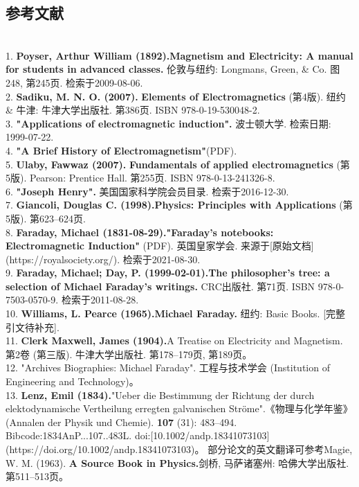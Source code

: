 \subsection{参考文献}\\
1. \textbf{Poyser, Arthur William (1892).}\textbf{Magnetism and Electricity: A manual for students in advanced classes.} 伦敦与纽约: Longmans, Green, & Co. 图248, 第245页. 检索于2009-08-06.\\
2. \textbf{Sadiku, M. N. O. (2007).} \textbf{Elements of Electromagnetics} (第4版). 纽约 & 牛津: 牛津大学出版社. 第386页. ISBN 978-0-19-530048-2.\\
3. \textbf{"Applications of electromagnetic induction".} 波士顿大学. 检索日期: 1999-07-22.\\
4. \textbf{"A Brief History of Electromagnetism"}(PDF).\\
5. \textbf{Ulaby, Fawwaz (2007).} \textbf{Fundamentals of applied electromagnetics} (第5版). Pearson: Prentice Hall. 第255页. ISBN 978-0-13-241326-8.\\
6. \textbf{"Joseph Henry".} 美国国家科学院会员目录. 检索于2016-12-30.\\
7. \textbf{Giancoli, Douglas C. (1998).}\textbf{Physics: Principles with Applications} (第5版). 第623–624页.\\
8. \textbf{Faraday, Michael (1831-08-29).}\textbf{"Faraday's notebooks: Electromagnetic Induction"} (PDF). 英国皇家学会. 来源于[原始文档](https://royalsociety.org/). 检索于2021-08-30.\\
9. \textbf{Faraday, Michael; Day, P. (1999-02-01).}\textbf{The philosopher's tree: a selection of Michael Faraday's writings.} CRC出版社. 第71页. ISBN 978-0-7503-0570-9. 检索于2011-08-28.\\
10. \textbf{Williams, L. Pearce (1965).}\textbf{Michael Faraday.} 纽约: Basic Books. [完整引文待补充].\\
11. \textbf{Clerk Maxwell, James (1904).}A Treatise on Electricity and Magnetism. 第2卷 (第三版). 牛津大学出版社. 第178–179页, 第189页。\\  
12. "Archives Biographies: Michael Faraday". 工程与技术学会 (Institution of Engineering and Technology)。\\
13. \textbf{Lenz, Emil (1834).}"Ueber die Bestimmung der Richtung der durch elektodynamische Vertheilung erregten galvanischen Ströme".《物理与化学年鉴》(Annalen der Physik und Chemie). \textbf{107} (31): 483–494. Bibcode:1834AnP...107..483L. doi:[10.1002/andp.18341073103](https://doi.org/10.1002/andp.18341073103)。
部分论文的英文翻译可参考Magie, W. M. (1963). \textbf{A Source Book in Physics.}剑桥, 马萨诸塞州: 哈佛大学出版社. 第511–513页。\\
